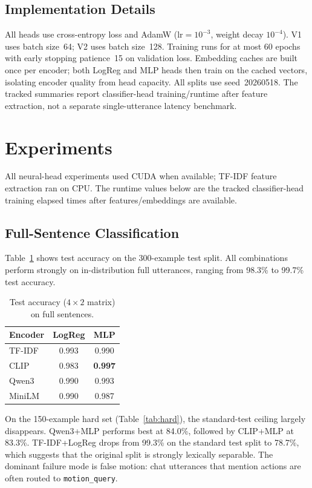\documentclass{article}
\begin{document}
\subsection{Implementation Details}
All heads use cross-entropy loss and AdamW ($\text{lr}=10^{-3}$, weight decay
$10^{-4}$). V1 uses batch size~64; V2 uses batch size~128.
Training runs for at most 60 epochs with early stopping patience~15 on
validation loss.
Embedding caches are built once per encoder; both LogReg and MLP heads then
train on the cached vectors, isolating encoder quality from head capacity.
All splits use seed~20260518. The tracked summaries report classifier-head
training/runtime after feature extraction, not a separate single-utterance
latency benchmark.

\section{Experiments}

All neural-head experiments used CUDA when available; TF-IDF feature extraction
ran on CPU. The runtime values below are the tracked classifier-head training
elapsed times after features/embeddings are available.

\subsection{Full-Sentence Classification}

Table~\ref{tab:full-acc} shows test accuracy on the 300-example test split.
All combinations perform strongly on in-distribution full utterances, ranging
from 98.3\% to 99.7\% test accuracy.

\begin{table}[h]
  \centering
  \caption{Test accuracy ($4 \times 2$ matrix) on full sentences.}
  \label{tab:full-acc}
  \begin{tabular}{lcc}
    \toprule
    Encoder & LogReg & MLP \\
    \midrule
    TF-IDF  & 0.993 & 0.990 \\
    CLIP    & 0.983 & \textbf{0.997} \\
    Qwen3   & 0.990 & 0.993 \\
    MiniLM  & 0.990 & 0.987 \\
    \bottomrule
  \end{tabular}
\end{table}

On the 150-example hard set (Table~\ref{tab:hard}), the standard-test ceiling
largely disappears. Qwen3+MLP performs best at 84.0\%, followed by CLIP+MLP at
83.3\%. TF-IDF+LogReg drops from 99.3\% on the standard test split to 78.7\%,
which suggests that the original split is strongly lexically separable.
The dominant failure mode is false motion: chat utterances that mention actions
are often routed to \texttt{motion\_query}.
\end{document}

